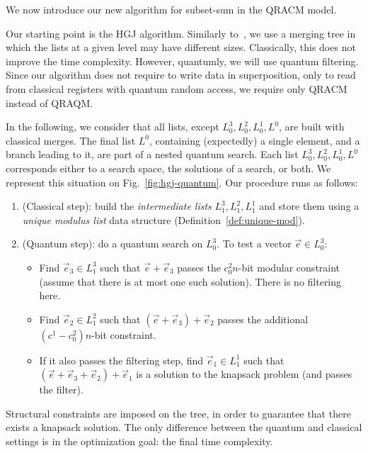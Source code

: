 We now introduce our new algorithm for subset-sum in the QRACM model.

Our starting point is the HGJ algorithm. Similarly to~\cite{DBLP:journals/iacr/Naya-PlasenciaS19}, we use a merging tree in which the lists at a given level may have different sizes. Classically, this does not improve the time complexity. However, quantumly, we will use quantum filtering. Since our algorithm does not require to write data in superposition, only to read from classical registers with quantum random access, we require only QRACM instead of QRAQM.


In the following, we consider that all lists, except $L_0^3, L_0^2, L_0^1, L^0$, are built with classical merges. The final list $L^0$, containing (expectedly) a single element, and a branch leading to it, are part of a nested quantum search. Each list $L_0^3, L_0^2, L_0^1, L^0$ corresponds either to a search space, the solutions of a search, or both. We represent this situation on Fig.~\ref{fig:hgj-quantum}. Our procedure runs as follows:
\begin{enumerate}
\item (Classical step): build the \emph{intermediate lists} $L_1^3, L_1^2, L_1^1$ and store them using a \emph{unique modulus list} data structure (Definition~\ref{def:unique-mod}).
\item (Quantum step): do a quantum search on $L_0^3$. To test a vector $\vec{e} \in L_0^3$:
\begin{itemize}
\item Find $\vec{e}_3 \in L_1^3$ such that $\vec{e} + \vec{e}_3$ passes the $c^2_0n$-bit modular constraint (assume that there is at most one such solution). There is no filtering here.
\item Find $\vec{e}_2 \in L_1^2$ such that $(\vec{e} + \vec{e}_3) + \vec{e}_2$ passes the additional $(c^1-c^2_0)n$-bit constraint.
\item If it also passes the filtering step, find $\vec{e}_1 \in L_1^1$ such that $(\vec{e} + \vec{e}_3 + \vec{e}_2) + \vec{e}_1$ is a solution to the knapsack problem (and passes the filter).
\end{itemize}
\end{enumerate}

Structural constraints are imposed on the tree, in order to guarantee that there exists a knapsack solution. The only difference between the quantum and classical settings is in the optimization goal: the final time complexity.


